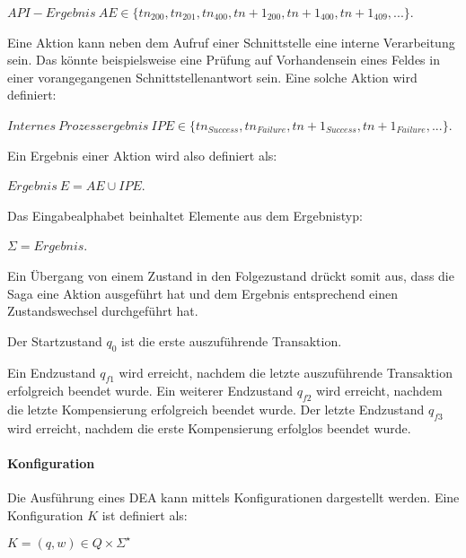 \begin{center}
$API-Ergebnis\ AE \in \{tn_{200}, tn_{201}, tn_{400}, tn+1_{200}, tn+1_{400}, tn+1_{409}, ...\}$. 
\end{center}

Eine Aktion kann neben dem Aufruf einer Schnittstelle eine interne Verarbeitung sein. Das könnte beispielsweise eine Prüfung auf Vorhandensein eines Feldes in einer vorangegangenen Schnittstellenantwort sein. Eine solche Aktion wird definiert:

\begin{center}
$Internes\ Prozessergebnis\ IPE \in \{tn_{Success}, tn_{Failure}, tn+1_{Success}, tn+1_{Failure}, ...\}$.
\end{center}

Ein Ergebnis einer Aktion wird also definiert als:

\begin{center}
$Ergebnis\ E = AE \cup IPE$.
\end{center}

Das Eingabealphabet beinhaltet Elemente aus dem Ergebnistyp: 

\begin{center}
$\Sigma = Ergebnis$.
\end{center}

Ein Übergang von einem Zustand in den Folgezustand drückt somit aus, dass die Saga eine Aktion ausgeführt hat und dem Ergebnis entsprechend einen Zustandswechsel durchgeführt hat. 

Der Startzustand $q_0$ ist die erste auszuführende Transaktion. 

Ein Endzustand $q_{f1}$ wird erreicht, nachdem die letzte auszuführende Transaktion erfolgreich beendet wurde. Ein weiterer Endzustand $q_{f2}$ wird erreicht, nachdem die letzte Kompensierung erfolgreich beendet wurde. Der letzte Endzustand $q_{f3}$ wird erreicht, nachdem die erste Kompensierung erfolglos beendet wurde.

\paragraph*{Konfiguration}%
Die Ausführung eines DEA kann mittels Konfigurationen dargestellt werden. Eine Konfiguration $K$ ist definiert als: 

\begin{center}
$K = (q, w) \in Q \times \Sigma^{\star}$
\end{center}

